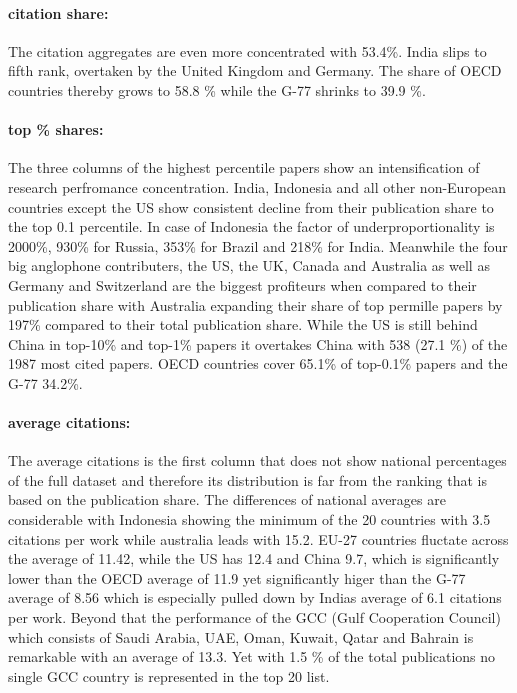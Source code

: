 \documentclass{article}
\begin{document}
\paragraph{citation share:} The citation aggregates are even more concentrated with 53.4\%. India slips to fifth rank, overtaken by the United Kingdom and Germany. The share of OECD countries thereby grows to 58.8 \% while the G-77 shrinks to 39.9 \%. 

\paragraph{top \% shares:} The three columns of the highest percentile papers show an intensification of research perfromance concentration. India, Indonesia and all other non-European countries except the US show consistent decline from their publication share to the top 0.1 percentile. In case of Indonesia the factor of underproportionality is 2000\%, 930\% for Russia, 353\% for Brazil and 218\% for India. Meanwhile the four big anglophone contributers, the US, the UK, Canada and Australia as well as Germany and Switzerland are the biggest profiteurs when compared to their publication share with Australia expanding their share of top permille papers by 197\% compared to their total publication share. While the US is still behind China in top-10\% and top-1\% papers it overtakes China with 538 (27.1 \%) of the 1987 most cited papers. OECD countries cover 65.1\% of top-0.1\% papers and the G-77 34.2\%. 

\paragraph{average citations:} The average citations is the first column that does not show national percentages of the full dataset and therefore its distribution is far from the ranking that is based on the publication share. The differences of national averages are considerable with Indonesia showing the minimum of the 20 countries with 3.5 citations per work while australia leads with 15.2. EU-27 countries fluctate across the average of 11.42, while the US has 12.4 and China 9.7, which is significantly lower than the OECD average of 11.9 yet significantly higer than the G-77 average of 8.56 which is especially pulled down by Indias average of 6.1 citations per work. Beyond that the performance of the GCC (Gulf Cooperation Council) which consists of Saudi Arabia, UAE, Oman, Kuwait, Qatar and Bahrain is remarkable with an average of 13.3. Yet with 1.5 \% of the total publications no single GCC country is represented in the top 20 list.
\end{document}
